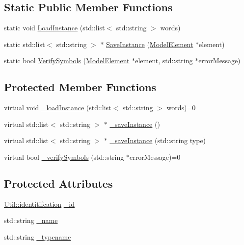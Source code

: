 \subsection*{Static Public Member Functions}
\begin{DoxyCompactItemize}
\item 
static void \hyperlink{class_model_element_a24559a388c7007546ad49bcf08bf4629}{Load\+Instance} (std\+::list$<$ std\+::string $>$ words)
\item 
static std\+::list$<$ std\+::string $>$ $\ast$ \hyperlink{class_model_element_a50aa786eb47edc2e059c1bba5a6ff32e}{Save\+Instance} (\hyperlink{class_model_element}{Model\+Element} $\ast$element)
\item 
static bool \hyperlink{class_model_element_aeaa89048bdd5344d2fb6eaf8325a9203}{Verify\+Symbols} (\hyperlink{class_model_element}{Model\+Element} $\ast$element, std\+::string $\ast$error\+Message)
\end{DoxyCompactItemize}
\subsection*{Protected Member Functions}
\begin{DoxyCompactItemize}
\item 
virtual void \hyperlink{class_model_element_a8208ee1dbd8b15acf7c2a0a85b218d56}{\+\_\+load\+Instance} (std\+::list$<$ std\+::string $>$ words)=0
\item 
virtual std\+::list$<$ std\+::string $>$ $\ast$ \hyperlink{class_model_element_af20dbba778ca07b23b299f2be73dc964}{\+\_\+save\+Instance} ()
\item 
virtual std\+::list$<$ std\+::string $>$ $\ast$ \hyperlink{class_model_element_ae1d44a8e317ca1f8b9481e0dd3c2e495}{\+\_\+save\+Instance} (std\+::string type)
\item 
virtual bool \hyperlink{class_model_element_a42d23a83672cf746c709a031966484b2}{\+\_\+verify\+Symbols} (std\+::string $\ast$error\+Message)=0
\end{DoxyCompactItemize}
\subsection*{Protected Attributes}
\begin{DoxyCompactItemize}
\item 
\hyperlink{class_util_ad17d458d9344b10bba64347e514d6d71}{Util\+::identitifcation} \hyperlink{class_model_element_a6fad7713205faa286c8da77d1eb4c75b}{\+\_\+id}
\item 
std\+::string \hyperlink{class_model_element_a4596c8a39e5df84d6f34249289eeeab8}{\+\_\+name}
\item 
std\+::string \hyperlink{class_model_element_a6c4a58886b4ca51831ad096d0b994e0b}{\+\_\+typename}
\end{DoxyCompactItemize}


